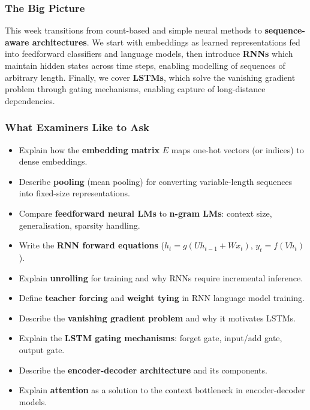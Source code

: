 \separator

\subsubsection*{The Big Picture}

This week transitions from count-based and simple neural methods to \textbf{sequence-aware architectures}. We start with embeddings as learned representations fed into feedforward classifiers and language models, then introduce \textbf{RNNs} which maintain hidden states across time steps, enabling modelling of sequences of arbitrary length. Finally, we cover \textbf{LSTMs}, which solve the vanishing gradient problem through gating mechanisms, enabling capture of long-distance dependencies.

\separator

\subsubsection*{What Examiners Like to Ask}

\begin{itemize}
  \item Explain how the \textbf{embedding matrix} $E$ maps one-hot vectors (or indices) to dense embeddings.
  \item Describe \textbf{pooling} (mean pooling) for converting variable-length sequences into fixed-size representations.
  \item Compare \textbf{feedforward neural LMs} to \textbf{n-gram LMs}: context size, generalisation, sparsity handling.
  \item Write the \textbf{RNN forward equations} ($h_t = g(Uh_{t-1} + Wx_t)$, $y_t = f(Vh_t)$).
  \item Explain \textbf{unrolling} for training and why RNNs require incremental inference.
  \item Define \textbf{teacher forcing} and \textbf{weight tying} in RNN language model training.
  \item Describe the \textbf{vanishing gradient problem} and why it motivates LSTMs.
  \item Explain the \textbf{LSTM gating mechanisms}: forget gate, input/add gate, output gate.
  \item Describe the \textbf{encoder-decoder architecture} and its components.
  \item Explain \textbf{attention} as a solution to the context bottleneck in encoder-decoder models.
\end{itemize}

